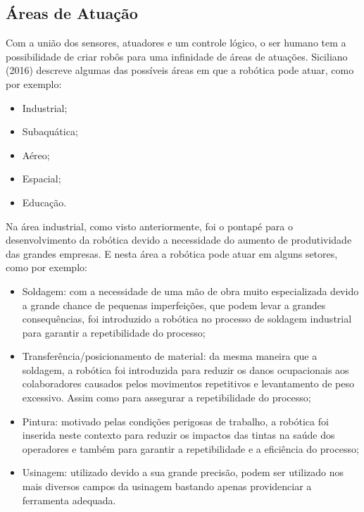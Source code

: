 \subsection{Áreas de Atuação}\label{sec:atuation}
Com a união dos sensores, atuadores e um controle lógico, o ser humano tem a possibilidade de criar robôs para uma infinidade de áreas de atuações. Siciliano (2016) descreve algumas das possíveis áreas em que a robótica pode atuar, como por exemplo:

\begin{itemize}
	\item Industrial;
	
	\item Subaquática;
	
	\item Aéreo;
	
	\item Espacial;
	
	\item Educação.
\end{itemize}

Na área industrial, como visto anteriormente, foi o pontapé para o desenvolvimento da robótica devido a necessidade do aumento de produtividade das grandes empresas. E nesta área a robótica pode atuar em alguns setores, como por exemplo:

\begin{itemize}
	\item Soldagem: com a necessidade de uma mão de obra muito especializada devido a grande chance de pequenas imperfeições, que podem levar a grandes consequências, foi introduzido a robótica no processo de soldagem industrial para garantir a repetibilidade do processo;
	
	\item Transferência/posicionamento de material: da mesma maneira que a soldagem, a robótica foi introduzida para reduzir os danos ocupacionais aos colaboradores causados pelos movimentos repetitivos e levantamento de peso excessivo. Assim como para assegurar a repetibilidade do processo;
	
	\item Pintura: motivado pelas condições perigosas de trabalho, a robótica foi inserida neste contexto para reduzir os impactos das tintas na saúde dos operadores e também para garantir a repetibilidade e a eficiência do processo;
	
	\item Usinagem: utilizado devido a sua grande precisão, podem ser utilizado nos mais diversos campos da usinagem bastando apenas providenciar a ferramenta adequada.
\end{itemize}

